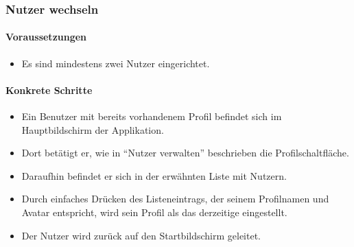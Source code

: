 \subsubsection{Nutzer wechseln}
\paragraph{Voraussetzungen}
\begin{itemize}
\item Es sind mindestens zwei Nutzer eingerichtet.
\end{itemize}

\paragraph{Konkrete Schritte}
\begin{itemize}
\item Ein Benutzer mit bereits vorhandenem Profil befindet sich im Hauptbildschirm der Applikation.
\item Dort betätigt er, wie in "`Nutzer verwalten"' beschrieben die Profilschaltfläche.
\item Daraufhin befindet er sich in der erwähnten Liste mit Nutzern. 
\item Durch einfaches Drücken des Listeneintrags, der seinem Profilnamen und
Avatar entspricht, wird sein Profil als das derzeitige eingestellt.
\item Der Nutzer wird zurück auf den Startbildschirm geleitet.
\end{itemize}
